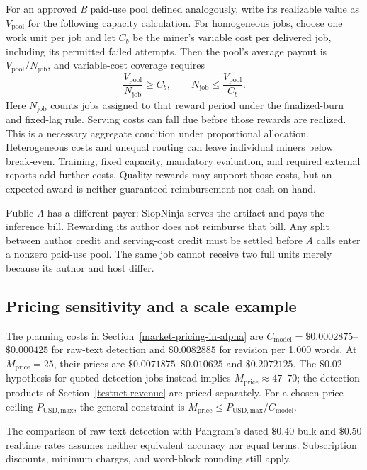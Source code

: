 For an approved \textit{B} paid-use pool defined analogously, write its realizable
value as \(V_{\mathrm{pool}}\) for the following capacity calculation. For
homogeneous jobs, choose one work unit per job and let
\(C_b\) be the miner's variable cost per delivered job, including its permitted
failed attempts. Then the pool's average payout is \(V_{\mathrm{pool}}/N_{\mathrm{job}}\), and variable-cost
coverage requires
\begin{equation}\label{eq:inference-capacity}
 \frac{V_{\mathrm{pool}}}{N_{\mathrm{job}}}\ge C_b,\qquad N_{\mathrm{job}}\le\frac{V_{\mathrm{pool}}}{C_b}.
\end{equation}
Here \(N_{\mathrm{job}}\) counts jobs assigned to that reward period under the finalized-burn
and fixed-lag rule. Serving costs can fall due before those rewards are realized.
This is a necessary aggregate condition under proportional allocation.
Heterogeneous costs and unequal routing can leave individual miners below
break-even. Training, fixed capacity, mandatory evaluation, and required
external reports add further costs. Quality rewards may support those costs,
but an expected award is neither guaranteed reimbursement nor cash on hand.

Public \textit{A} has a different payer: SlopNinja serves the artifact and
pays the inference bill. Rewarding its author does not reimburse that bill.
Any split between author credit and serving-cost credit must be settled before
\textit{A} calls enter a nonzero paid-use pool. The same job cannot receive
two full units merely because its author and host differ.

\subsection{Pricing sensitivity and a scale example}

The planning costs in Section~\ref{market-pricing-in-alpha} are
\(C_{\mathrm{model}}=\$0.0002875\)--\(\$0.000425\) for raw-text detection and
\(\$0.0082885\) for revision per 1,000 words. At \(M_{\mathrm{price}}=25\), their
prices are \(\$0.0071875\)--\(\$0.010625\) and \(\$0.2072125\). The \(\$0.02\)
hypothesis for quoted detection jobs instead implies
\(M_{\mathrm{price}}\approx47\)--\(70\); the detection products of
Section~\ref{testnet-revenue} are priced separately. For a
chosen price ceiling \(P_{\mathrm{USD,max}}\), the general constraint is
\(M_{\mathrm{price}}\le P_{\mathrm{USD,max}}/C_{\mathrm{model}}\).

The comparison of raw-text detection with Pangram's dated \(\$0.40\) bulk and
\(\$0.50\) realtime rates assumes neither equivalent accuracy nor equal terms.
Subscription discounts, minimum charges, and word-block rounding still apply.

